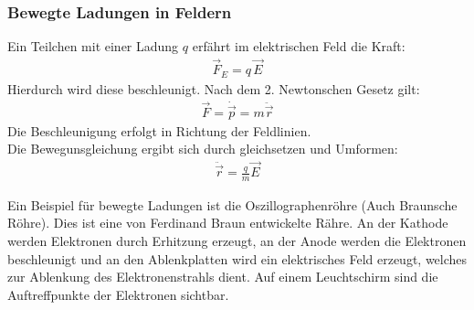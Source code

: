 \documentclass{scrartcl}
\begin{document}
\subsubsection{Bewegte Ladungen in Feldern}
Ein Teilchen mit einer Ladung $q$ erfährt im elektrischen Feld die Kraft:
\begin{align}
    \vec{F}_E=q\,\vec{E}
\end{align}
Hierdurch wird diese beschleunigt. Nach dem 2. Newtonschen Gesetz gilt:
\begin{align}
    \vec{F}=\dot{\vec{p}}=m\ddot{\vec{r}}
\end{align}
Die Beschleunigung erfolgt in Richtung der Feldlinien.\\
Die Bewegunsgleichung ergibt sich durch gleichsetzen und Umformen:
\begin{align}
    \ddot{\vec{r}}=\frac{q}{m}\vec{E}
\end{align}
\vspace{0.5cm}

\noindent Ein Beispiel für bewegte Ladungen ist die Oszillographenröhre (Auch Braunsche Röhre).
Dies ist eine von Ferdinand Braun entwickelte Rähre. An der Kathode werden Elektronen 
durch Erhitzung erzeugt, an der Anode werden die Elektronen beschleunigt und an den Ablenkplatten wird ein elektrisches 
Feld erzeugt, welches zur Ablenkung des Elektronenstrahls dient. Auf einem Leuchtschirm sind die Auftreffpunkte 
der Elektronen sichtbar.
\end{document}
